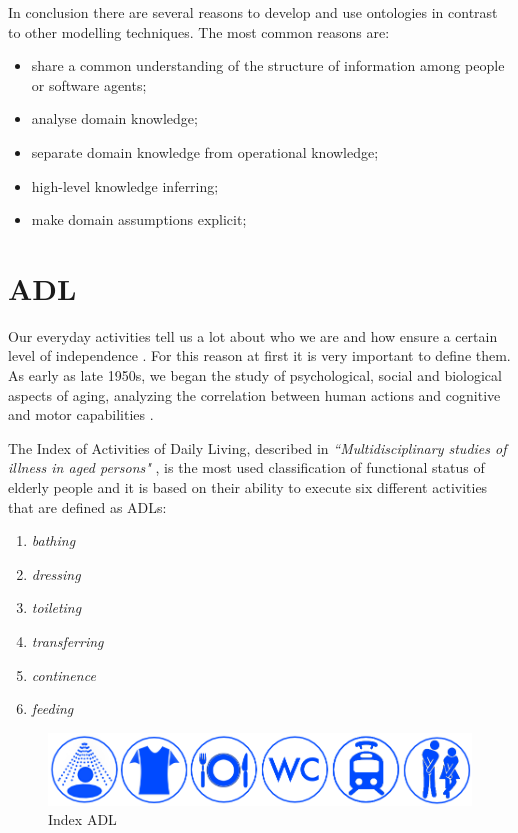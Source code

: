 \documentclass{thesisreport}
\begin{document}
In conclusion there are several reasons to develop and use ontologies in contrast to other modelling techniques. The most common reasons are:
\begin{itemize}
    \item share a common understanding of the structure of information among people or software agents;
    \item analyse domain knowledge;
    \item separate domain knowledge from operational knowledge;
    \item high-level knowledge inferring;
    \item make domain assumptions explicit;
\end{itemize}


\section{ADL}
Our everyday activities tell us a lot about who we are and how ensure a certain level of independence \cite{buoncompagni2017towards}. For this reason at first it is very important to define them. As early as late 1950s, we began the study of psychological, social and biological aspects of aging, analyzing the correlation between human actions and cognitive and motor capabilities \cite{buoncompagni2017towards}. 

The Index of Activities of Daily Living, described in \textit{``Multidisciplinary studies of illness in aged persons"} \cite{Multidisciplinary},  is the most used classification of functional status of elderly people and it is based on their ability to execute six different activities that are defined as ADLs:
\begin{enumerate}
    \item \textit{bathing}
    \item \textit{dressing}
    \item \textit{toileting}
    \item \textit{transferring}
    \item \textit{continence}
    \item \textit{feeding}
\end{enumerate}

\begin{figure}[H]
	\centering
	\includegraphics[width=17cm]{Thesis/data/IndexADL.png}
	\caption{Index ADL}
	\label{fig:indexADL}
\end{figure}
\end{document}

